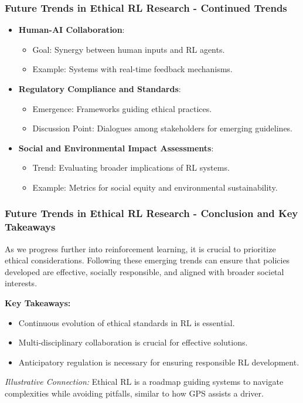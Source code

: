 \documentclass{beamer}
\begin{document}
\begin{frame}[fragile]
    \frametitle{Future Trends in Ethical RL Research - Continued Trends}
    \begin{itemize}
        \item \textbf{Human-AI Collaboration}:
            \begin{itemize}
                \item Goal: Synergy between human inputs and RL agents.
                \item Example: Systems with real-time feedback mechanisms.
            \end{itemize}
        
        \item \textbf{Regulatory Compliance and Standards}:
            \begin{itemize}
                \item Emergence: Frameworks guiding ethical practices.
                \item Discussion Point: Dialogues among stakeholders for emerging guidelines.
            \end{itemize}
        
        \item \textbf{Social and Environmental Impact Assessments}:
            \begin{itemize}
                \item Trend: Evaluating broader implications of RL systems.
                \item Example: Metrics for social equity and environmental sustainability.
            \end{itemize}
    \end{itemize}
\end{frame}

\begin{frame}[fragile]
    \frametitle{Future Trends in Ethical RL Research - Conclusion and Key Takeaways}
    As we progress further into reinforcement learning, it is crucial to prioritize ethical considerations. 
    Following these emerging trends can ensure that policies developed are effective, socially responsible, and aligned with broader societal interests.

    \textbf{Key Takeaways:}
    \begin{itemize}
        \item Continuous evolution of ethical standards in RL is essential.
        \item Multi-disciplinary collaboration is crucial for effective solutions.
        \item Anticipatory regulation is necessary for ensuring responsible RL development.
    \end{itemize}
    \textit{Illustrative Connection:} Ethical RL is a roadmap guiding systems to navigate complexities while avoiding pitfalls, similar to how GPS assists a driver.
\end{frame}
\end{document}
